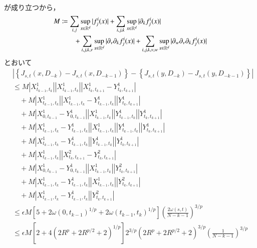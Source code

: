 \begin{prf}
\begin{description}
\begin{align}
				\end{align}
				が成り立つから，
				\begin{align}
					M &\coloneqq \sum_{i,j} \operatorname*{sup}_{x \in \mathbb{R}^d} |f^i_j(x)| + \sum_{i,j,k} \operatorname*{sup}_{x \in \mathbb{R}^d} |\partial_k f^i_j(x)| \\
						&\qquad + \sum_{i,j,k,v} \operatorname*{sup}_{x \in \mathbb{R}^d} |\partial_v \partial_k f^i_j(x)|
						+ \sum_{i,j,k,v,w} \operatorname*{sup}_{x \in \mathbb{R}^d} |\partial_w \partial_v \partial_k f^i_j(x)|
					\label{eq:continuity_theorem_2_4}
				\end{align}
				とおいて
				\begin{align}
					&\left| \left\{ J_{s,t}(x,D_{-k}) - J_{s,t}(x,D_{-k-1}) \right\} - 
						\left\{ J_{s,t}(y,D_{-k}) - J_{s,t}(y,D_{-k-1}) \right\} \right| \\
					&\leq M \left|X^1_{t_{k-1},t_k}\right| \left|X^1_{t_{k-1},t_k}\right| \left| X^1_{t_k,t_{k+1}} - Y^1_{t_k,t_{k+1}} \right| \\
						&\quad + M \left| X^1_{t_{k-1},t_k} \right| \left| X^1_{t_{k-1},t_k} - Y^1_{t_{k-1},t_k} \right| \left| Y^1_{t_k,t_{k+1}} \right| \\
						&\quad + M \left| X^1_{0,t_{k-1}} - Y^1_{0,t_{k-1}} \right| \left| X^1_{t_{k-1},t_k} \right| \left| Y^1_{t_{k-1},t_k} \right| \left| Y^1_{t_k,t_{k+1}} \right| \\
						&\quad + M \left| X^1_{t_{k-1},t_k} - Y^1_{t_{k-1},t_k} \right| \left| X^1_{t_{k-1},t_k} \right| \left| Y^1_{t_{k-1},t_k} \right| \left| Y^1_{t_k,t_{k+1}} \right| \\
						&\quad + M \left| X^1_{t_{k-1},t_k} - Y^1_{t_{k-1},t_k} \right| \left| Y^1_{t_{k-1},t_k} \right| \left| Y^1_{t_k,t_{k+1}} \right| \\
						&\quad + M \left| X^1_{t_{k-1},t_k} \right| \left| X^2_{t_k,t_{k+1}} - Y^2_{t_k,t_{k+1}} \right| \\
						&\quad + M \left| X^1_{0,t_{k-1}} - Y^1_{0,t_{k-1}} \right| \left| X^1_{t_{k-1},t_k} \right| \left| Y^2_{t_k,t_{k+1}} \right| \\
						&\quad + M \left| X^1_{t_{k-1},t_k} - Y^1_{t_{k-1},t_k} \right| \left| X^1_{t_{k-1},t_k} \right| \left| Y^2_{t_k,t_{k+1}} \right| \\
						&\quad + M \left| X^1_{t_{k-1},t_k} - Y^1_{t_{k-1},t_k} \right| \left| Y^2_{t_k,t_{k+1}} \right| \\
					&\leq \epsilon M \left[5 + 2\omega(0,t_{k-1})^{1/p} + 2\omega(t_{k-1},t_k)^{1/p} \right] \left( \frac{2\omega(s,t)}{N-k-1} \right)^{3/p} \\
					&\leq \epsilon M \left[2 + 4\left( 2 R^p + 2R^{p/2} + 2 \right)^{1/p} \right] 2^{3/p} \left( 2 R^p + 2R^{p/2} + 2 \right)^{3/p} \left( \frac{1}{N-k-1} \right)^{3/p}

\end{align}
\end{description}
\end{prf}
